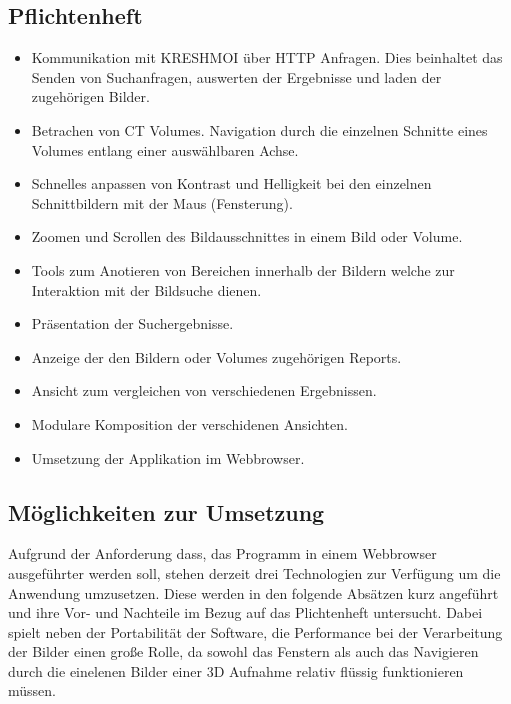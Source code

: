 \subsection{Pflichtenheft}
\label{sec:Pflichtenheft}
\begin{itemize}
	\item Kommunikation mit KRESHMOI über HTTP Anfragen. Dies beinhaltet das Senden von Suchanfragen, auswerten der Ergebnisse und laden der zugehörigen Bilder.
	\item Betrachen von CT Volumes. Navigation durch die einzelnen Schnitte eines Volumes entlang einer auswählbaren Achse.
	\item Schnelles anpassen von Kontrast und Helligkeit bei den einzelnen Schnittbildern mit der Maus (Fensterung).
	\item Zoomen und Scrollen des Bildausschnittes in einem Bild oder Volume.
	\item Tools zum Anotieren von Bereichen innerhalb der Bildern welche zur Interaktion mit der Bildsuche dienen.
	\item Präsentation der Suchergebnisse.
	\item Anzeige der den Bildern oder Volumes zugehörigen Reports.
	\item Ansicht zum vergleichen von verschiedenen Ergebnissen.
	\item Modulare Komposition der verschidenen Ansichten.
	\item Umsetzung der Applikation im Webbrowser.
\end{itemize}

\subsection{Möglichkeiten zur Umsetzung}
\label{sec:Möglichkeiten zur Umsetzung}
Aufgrund der Anforderung dass, das Programm in einem Webbrowser ausgeführter werden soll, stehen derzeit drei Technologien zur Verfügung um die Anwendung umzusetzen.
Diese werden in den folgende Absätzen kurz angeführt und ihre Vor- und Nachteile im Bezug auf das Plichtenheft untersucht.
Dabei spielt neben der Portabilität der Software, 
die Performance bei der Verarbeitung der Bilder einen große Rolle, da sowohl das Fenstern als auch das Navigieren durch die einelenen Bilder einer 3D Aufnahme relativ flüssig funktionieren müssen.

